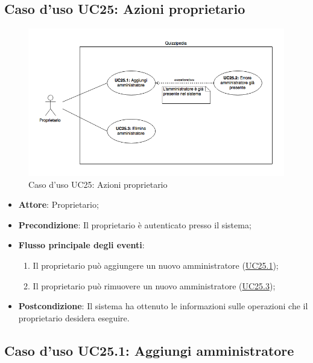 \documentclass[12pt,a4paper]{article}
\begin{document}
\subsection{Caso d'uso UC25: Azioni proprietario}
\begin{figure}[H]
	\centering
	\includegraphics[width=\textwidth]{../img/diagramUC25.png}
	\caption{Caso d'uso UC25: Azioni proprietario}\label{fig:UC25} 
\end{figure}
\begin{itemize}

\item \textbf{Attore}: Proprietario; 
\item \textbf{Precondizione}: Il proprietario è autenticato presso il sistema;

\item \textbf{Flusso principale degli eventi}:
\begin{enumerate}
	\item Il proprietario può aggiungere un nuovo amministratore (\hyperlink{UC25.1}{UC25.1});
	\item Il proprietario può rimuovere un nuovo amministratore (\hyperlink{UC25.3}{UC25.3});
	
\end{enumerate}
\item \textbf{Postcondizione}: Il sistema ha ottenuto le informazioni sulle operazioni che il proprietario desidera eseguire.
\end{itemize}
\hypertarget{UC25.1}{}
\subsection{Caso d'uso UC25.1: Aggiungi amministratore}
\end{document}

